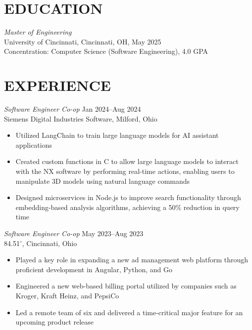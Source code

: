 \documentclass[margin]{res} %
\begin{document}
\begin{resume}
\vspace*{-5.0mm}


\section{EDUCATION}

{\sl Master of Engineering}\\
University of Cincinnati, Cincinnati, OH, May 2025 \\
Concentration: Computer Science (Software Engineering), 4.0 GPA

 
\section{EXPERIENCE}
{\sl Software Engineer Co-op} \hfill {\color{black} Jan 2024–Aug 2024} \\
Siemens Digital Industries Software, Milford, Ohio
\vspace{1mm}
\begin{itemize}  %
\item Utilized LangChain to train large language models for AI assistant applications 
\item Created custom functions in C to allow large language models to interact with the NX software by performing real-time actions, enabling users to manipulate 3D models using natural language commands 
\item Designed microservices in Node.js to improve search functionality through\\embedding-based analysis algorithms, achieving a 50\% reduction in query time 
\end{itemize}


{\sl Software Engineer Co-op} \hfill {\color{black} May 2023–Aug 2023}  \\
84.51$^{\circ}$, Cincinnati, Ohio 
\vspace{1mm}
\begin{itemize}  %
\item Played a key role in expanding a new ad management web platform through proficient development in Angular, Python, and Go
\item Engineered a new web-based billing portal utilized by companies such as Kroger, Kraft Heinz, and PepsiCo
\item Led a remote team of six and delivered a time-critical major feature for an upcoming product release
\end{itemize}


\end{resume}
\end{document}
